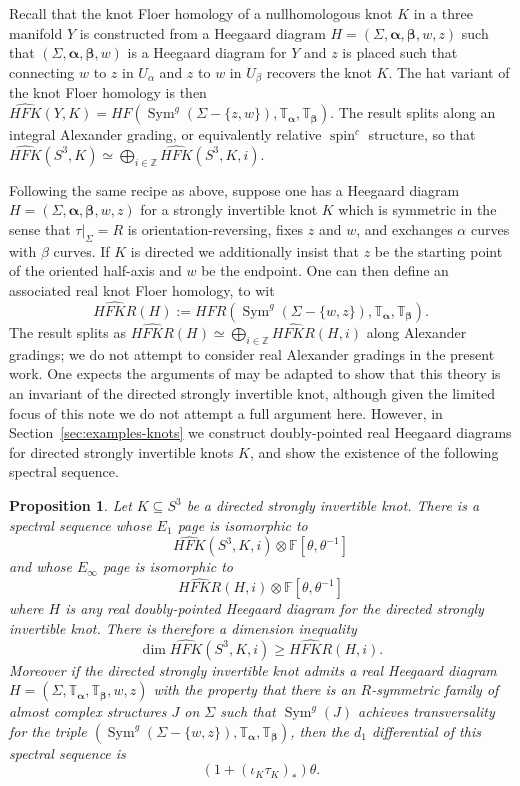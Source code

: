 \documentclass[11pt,reqno]{amsart}
\newtheorem{prop}[thm]{Proposition}
\theoremstyle{definition}
\theoremstyle{remark}
\newcommand{\T}{\mathbb{T}}
\renewcommand{\subset}{\subseteq}
\DeclareMathOperator{\spin}{{spin}}
\DeclareMathOperator{\Sym}{{Sym}}
\newcommand{\bF}{\mathbb{F}}
\newcommand{\alphas}{\boldsymbol \alpha}
\newcommand{\betas}{\boldsymbol \beta}
\newcommand{\HFR}{\mathit{HFR}}
\newcommand{\HFK}{\mathit{HFK}}
\newcommand\HFKhat{\widehat{\HFK}}
\newcommand \HFKR{ \widehat{\mathit{HFKR}}}
\numberwithin{equation}{section}
\begin{document}
Recall that the knot Floer homology of a nullhomologous knot $K$ in a three manifold $Y$ is constructed from a Heegaard diagram $H = (\Sigma, \alphas, \betas, w, z)$ such that $(\Sigma, \alphas, \betas, w)$ is a Heegaard diagram for $Y$ and $z$ is placed such that connecting $w$ to $z$ in $U_{\alpha}$ and $z$ to $w$ in $U_{\beta}$ recovers the knot $K$. The hat variant of the knot Floer homology is then $\HFKhat(Y,K) = HF(\Sym^g(\Sigma - \{z,w\}), \T_{\alphas}, \T_{\betas})$. The result splits along an integral Alexander grading, or equivalently relative $\spin^c$ structure, so that $\HFKhat(S^3,K) \simeq \bigoplus_{i \in \mathbb Z} \HFKhat(S^3,K,i)$. 

Following the same recipe as above, suppose one has a Heegaard diagram $H = (\Sigma, \alphas, \betas, w, z)$ for a strongly invertible knot $K$ which is symmetric in the sense that  $\tau|_{\Sigma}=R$ is orientation-reversing, fixes $z$ and $w$, and exchanges $\alpha$ curves with $\beta$ curves. If $K$ is directed we additionally insist that $z$ be the starting point of the oriented half-axis and $w$ be the endpoint. One can then define an associated real knot Floer homology, to wit
%
\[ \HFKR(H) := \HFR( \Sym^g(\Sigma -\{w,z\}), \T_{\alphas}, \T_{\betas}).\]
%
The result splits as $\HFKR(H) \simeq \bigoplus_{i \in \mathbb Z} \HFKR(H,i)$ along Alexander gradings; we do not attempt to consider real Alexander gradings in the present work. One expects the arguments of \cite[Section 3]{GM:real} may be adapted to show that this theory is an invariant of the directed strongly invertible knot, although given the limited focus of this note we do not attempt a full argument here. However, in Section~\ref{sec:examples-knots} we construct doubly-pointed real Heegaard diagrams for directed strongly invertible knots $K$, and show the existence of the following spectral sequence.

 
\begin{prop}\label{prop:si} Let $K \subset S^3$ be a directed strongly invertible knot. There is a spectral sequence whose $E_1$ page is isomorphic to
%
\[ \HFKhat(S^3, K, i) \otimes \bF[\theta, \theta^{-1}] \]
%
and whose $E_{\infty}$ page is isomorphic to
%
\[ \HFKR (H,i) \otimes \bF[\theta, \theta^{-1}]\]
%
where $H$ is any real doubly-pointed Heegaard diagram for the directed strongly invertible knot. There is therefore a dimension inequality
%
\[\dim \HFKhat(S^3, K, i) \geq \HFKR (H,i).\]
%
Moreover if the directed strongly invertible knot admits a real Heegaard diagram $H = (\Sigma, \T_{\alphas}, \T_{\betas}, w,z)$ with the property that there is an $R$-symmetric family of almost complex structures $J$ on $\Sigma$ such that $\Sym^g(J)$ achieves transversality for the triple $(\Sym^g(\Sigma -\{w,z\}), \T_{\alphas}, \T_{\betas})$, then the $d_1$ differential of this spectral sequence is
%
\[ (1 + (\iota_K \tau_K)_*) \theta.\]
\end{prop}
\end{document}
